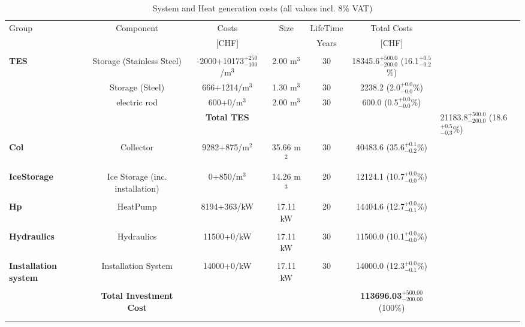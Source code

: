 \documentclass[english]{SPFShortReport}
\begin{document}
\begin{table}[!ht]
\centering
\caption{System and Heat generation costs (all values incl. 8$\%$ VAT) }
\begin{adjustbox}{max width =\textwidth}
\begin{tabular}{l | c c c c c } 
\hline
\hline
Group &Component &Costs &Size &LifeTime &Total Costs \\ 
 & &[CHF] & &Years &[CHF]\\ 
\hline
\\
\textbf{TES} & Storage (Stainless Steel) & -2000+10173$^{\mathrm{+250}}_{\mathrm{-100}}$/m$^3$ & 2.00 m$^3$ & 30 & 18345.6$^{\mathrm{+500.0}}_{\mathrm{-200.0}}$ (16.1$^{\mathrm{+0.5}}_{\mathrm{-0.2}}$\%) \\
 & Storage (Steel) & 666+1214/m$^3$ & 1.30 m$^3$ & 30 & 2238.2 (2.0$^{\mathrm{+0.0}}_{\mathrm{-0.0}}$\%) \\
 & electric rod & 600+0/m$^3$ & 2.00 m$^3$ & 30 & 600.0 (0.5$^{\mathrm{+0.0}}_{\mathrm{-0.0}}$\%) \\
&
 & \textbf{Total TES} & & & & 21183.8$^{\mathrm{+500.0}}_{\mathrm{-200.0}}$ (18.6$^{\mathrm{+0.5}}_{\mathrm{-0.3}}$\%) \\
\hline \\
\textbf{Col} & Collector & 9282+875/m$^2$ & 35.66 m$^2$ & 30 & 40483.6 (35.6$^{\mathrm{+0.1}}_{\mathrm{-0.2}}$\%) \\
\hline \\
\textbf{IceStorage} & Ice Storage (inc. installation) & 0+850/m$^3$ & 14.26 m$^3$ & 20 & 12124.1 (10.7$^{\mathrm{+0.0}}_{\mathrm{-0.0}}$\%) \\
\hline \\
\textbf{Hp} & HeatPump & 8194+363/kW & 17.11 kW & 20 & 14404.6 (12.7$^{\mathrm{+0.0}}_{\mathrm{-0.1}}$\%) \\
\hline \\
\textbf{Hydraulics} & Hydraulics & 11500+0/kW & 17.11 kW & 30 & 11500.0 (10.1$^{\mathrm{+0.0}}_{\mathrm{-0.0}}$\%) \\
\hline \\
\textbf{Installation system} & Installation System & 14000+0/kW & 17.11 kW & 30 & 14000.0 (12.3$^{\mathrm{+0.0}}_{\mathrm{-0.1}}$\%) \\
\hline \\
 & \textbf{Total Investment Cost} & & & & \textbf{113696.03$^{\mathrm{+500.00}}_{\mathrm{-200.00}}$} (100\%) \\ 
\hline \\ 
\hline \\ 

\end{tabular}
\end{adjustbox}
\end{table}
\end{document}
